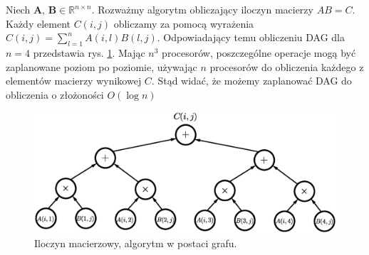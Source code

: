 \begin{przyklad}
Niech \(\mathbf{A}\), \(\mathbf{B}\in\mathbb{R}^{n\times n}\). Rozważmy algorytm obliczający iloczyn macierzy \(AB = C\). Każdy element \(C(i, j)\) obliczamy za pomocą wyrażenia \(C(i, j)=\sum_{l=1}^{n}A(i,l)B(l,j)\). Odpowiadający temu obliczeniu DAG dla \(n=4\) przedstawia rys. \ref{fig:standard_parallel}. Mając \(n^3\) procesorów, poszczególne operacje mogą być zaplanowane poziom po poziomie, używając \(n\) procesorów do obliczenia każdego z elementów macierzy wynikowej \(C\). Stąd widać, że możemy zaplanować DAG do obliczenia o złożoności \(O(\log{n})\)
\begin{figure}[H]
\centering
\includegraphics[width=34em]{images/Rys3.eps}
\caption{Iloczyn macierzowy, algorytm w postaci grafu.}
\label{fig:standard_parallel}
\end{figure}

\end{przyklad}
